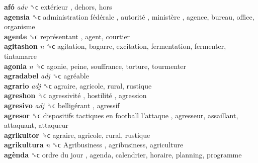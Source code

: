 \textbf{afó} \emph{adv}  ␝ϲ   extérieur , dehors, hors  \\
\textbf{agensia} ␝ϲ   administration fédérale ,  autorité ,  ministère , agence, bureau, office, organisme  \\
\textbf{agente} ␝ϲ   représentant , agent, courtier  \\
\textbf{agitashon} \emph{n}  ␝ϲ  agitation, bagarre, excitation, fermentation, fermenter, tintamarre  \\
\textbf{agonia} \emph{n}  ␝ϲ  agonie, peine, souffrance, torture, tourmenter  \\
\textbf{agradabel} \emph{adj}  ␝ϲ   agréable   \\
\textbf{agrario} \emph{adj}  ␝ϲ  agraire, agricole, rural, rustique  \\
\textbf{agreshon} ␝ϲ   agressivité ,  hostilité , agression  \\
\textbf{agresivo} \emph{adj}  ␝ϲ   belligérant , agressif  \\
\textbf{agresor} ␝ϲ   dispositifs tactiques en football l’attaque , agresseur, assaillant, attaquant, attaqueur  \\
\textbf{agrikultor} ␝ϲ  agraire, agricole, rural, rustique  \\
\textbf{agrikultura} \emph{n}  ␝ϲ   Agribusiness , agribusiness, agriculture  \\
\textbf{agènda} ␝ϲ   ordre du jour , agenda, calendrier, horaire, planning, programme  \\
